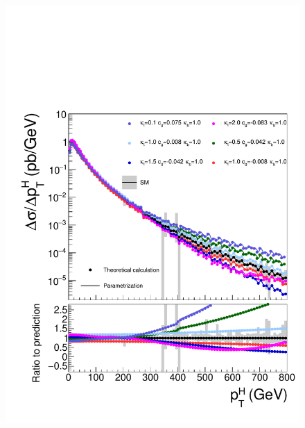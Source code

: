 \begin{figure}[hbtp]
  \begin{center}
    \includegraphics[width=\halflinewidth]{img/interpretation/other/varparcomp_ktcg.pdf}

\end{center}
\end{figure}
